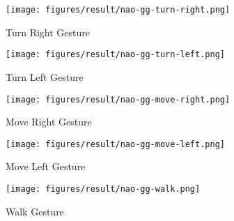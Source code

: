 \begin{figure}
	[h]	 	
	\begin{minipage}
		{.45 
			\textwidth}  
		\centering
		\texttt{[image: figures/result/nao-gg-turn-right.png]} \caption{Turn Right Gesture} \label{res:gg:turn:right} 
	\end{minipage}
	\begin{minipage}
		{.45 
			\textwidth}  
		\centering
		\texttt{[image: figures/result/nao-gg-turn-left.png]} \caption{Turn Left Gesture} \label{res:gg:turn:left} 
	\end{minipage}
	\begin{minipage}
		{.45
			\textwidth}  
		\centering
		\texttt{[image: figures/result/nao-gg-move-right.png]} \caption{Move Right Gesture} \label{res:gg:move:right} 
	\end{minipage}
	\begin{minipage}
		{.45
			\textwidth}  
		\centering
		\texttt{[image: figures/result/nao-gg-move-left.png]} \caption{Move Left Gesture} \label{res:gg:move:left} 
	\end{minipage}
	\begin{minipage}
		{.45
			\textwidth}  
		\centering
		\texttt{[image: figures/result/nao-gg-walk.png]} \caption{Walk Gesture} \label{res:gg:walk} 
	\end{minipage}	
\end{figure}
\label{res:gg}